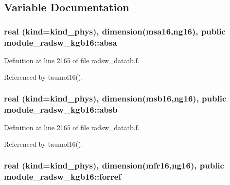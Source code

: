 \subsection{Variable Documentation}
\subsubsection[{\texorpdfstring{absa}{absa}}]{\setlength{\rightskip}{0pt plus 5cm}real (kind=kind\+\_\+phys), dimension({\bf msa16},ng16), public module\+\_\+radsw\+\_\+kgb16\+::absa}\hypertarget{namespacemodule__radsw__kgb16_a51fe40b5f24cc461850fe5be40d18869}{}\label{namespacemodule__radsw__kgb16_a51fe40b5f24cc461850fe5be40d18869}


Definition at line 2165 of file radsw\+\_\+datatb.\+f.



Referenced by taumol16().

\subsubsection[{\texorpdfstring{absb}{absb}}]{\setlength{\rightskip}{0pt plus 5cm}real (kind=kind\+\_\+phys), dimension({\bf msb16},ng16), public module\+\_\+radsw\+\_\+kgb16\+::absb}\hypertarget{namespacemodule__radsw__kgb16_afe8639128e4f7a48f133b7399addcb79}{}\label{namespacemodule__radsw__kgb16_afe8639128e4f7a48f133b7399addcb79}


Definition at line 2165 of file radsw\+\_\+datatb.\+f.



Referenced by taumol16().

\subsubsection[{\texorpdfstring{forref}{forref}}]{\setlength{\rightskip}{0pt plus 5cm}real (kind=kind\+\_\+phys), dimension({\bf mfr16},ng16), public module\+\_\+radsw\+\_\+kgb16\+::forref}\hypertarget{namespacemodule__radsw__kgb16_a8e8cf110f56c7d4253c63bbf607be34c}{}\label{namespacemodule__radsw__kgb16_a8e8cf110f56c7d4253c63bbf607be34c}


